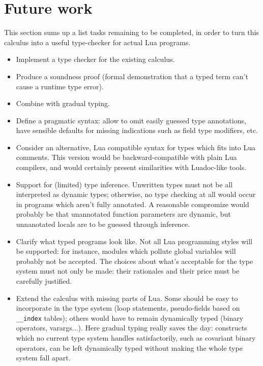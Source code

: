 
\section{Future work}
This section sums up a list tasks remaining to be completed, in order
to turn this calculus into a useful type-checker for actual Lua
programs.

\begin{itemize}
\item Implement a type checker for the existing calculus.
\item Produce a soundness proof (formal demonstration that a typed
  term can't cause a runtime type error).
\item Combine with gradual typing.
\item Define a pragmatic syntax: allow to omit easily guessed type
  annotations, have sensible defaults for missing indications such as
  field type modifiers, etc.
\item Consider an alternative, Lua compatible syntax for types which
  fits into Lua comments. This version would be backward-compatible
  with plain Lua compilers, and would certainly present similarities
  with Luadoc-like tools.
\item Support for (limited) type inference. Unwritten types must not
  be all interpreted as dynamic types; otherwise, no type checking at
  all would occur in programs which aren't fully annotated. A
  reasonable compromize would probably be that unannotated function
  parameters are dynamic, but unnanotated locals are to be guessed
  through inference.
\item Clarify what typed programs look like. Not all Lua programming
  styles will be supported: for instance, modules which pollute global
  variables will probably not be accepted. The choices about what's
  acceptable for the type system must not only be made: their
  rationales and their price must be carefully justified.
\item Extend the calculus with missing parts of Lua. Some should be
  easy to incorporate in the type system (loop statements,
  pseudo-fields based on \verb+__index+ tables); others
  would have to remain dynamically typed (binary operators,
  varargs...). Here gradual typing really saves the day: constructs
  which no current type system handles satisfactorily, such as
  covariant binary operators, can be left dynamically typed without
  making the whole type system fall apart.
\end{itemize}
